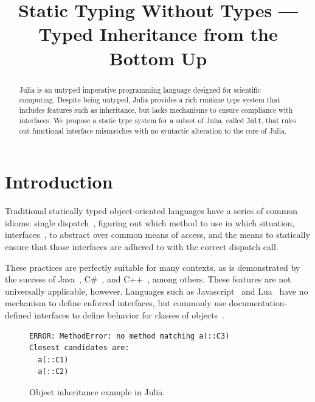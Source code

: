 \documentclass[preprint]{sigplanconf}
\newcommand{\xt}[1]{\texttt{#1}}
\newcommand{\jolt}{\xt{Jolt}}
\begin{document}
\title{Static Typing Without Types --- Typed Inheritance from the Bottom Up} 
\maketitle

\begin{abstract}
Julia is an untyped imperative programming language designed for scientific computing. 
Despite being untyped, Julia provides a rich runtime type system that includes features such as  
inheritance, but lacks mechanisms to ensure compliance with interfaces.
We propose a static type system for a subset of Julia, called \jolt, that rules out functional interface mismatches
with no syntactic alteration to the core of Julia.
\end{abstract}


\section{Introduction}

Traditional statically typed object-oriented languages have a series of
common idioms: single dispatch~\cite{jls}, figuring out which method
to use in which situation, interfaces~\cite{objinter, fj}, to abstract over 
common means of access, and the means to statically
ensure that those interfaces are adhered to with the correct dispatch call.

These practices are perfectly suitable for many contexts,
as is demonstrated by the success of Java~\cite{jls}, C\#~\cite{csls}, and C++~\cite{cppls}, among others.
These features are not universally applicable, however. Languages such as 
Javascript~\cite{ecma} and Lua~\cite{lualang} have no mechanism to define enforced
interfaces, but commonly use documentation-defined interfaces to define behavior
for classes of objects~\cite{lualang}.

\begin{figure}[h]


\begin{Verbatim}[fontsize=\scriptsize]
ERROR: MethodError: no method matching a(::C3)
Closest candidates are:
  a(::C1)
  a(::C2)
\end{Verbatim}
\caption{Object inheritance example in Julia.}
\label{code:broken}
\end{figure}
\end{document}
